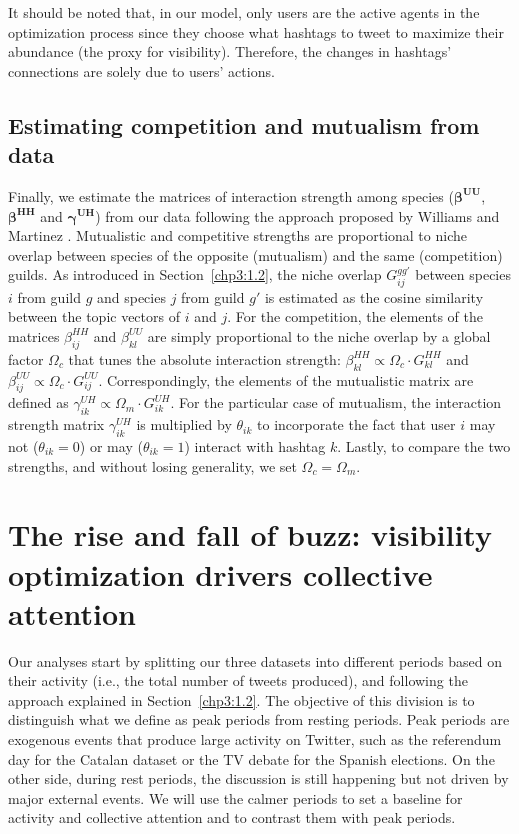 It should be noted that, in our model, only users are the active agents in the optimization process since they choose what hashtags to tweet to maximize their abundance (the proxy for visibility). Therefore, the changes in hashtags' connections are solely due to users' actions.  \\

\subsection{Estimating competition and mutualism from data}
\label{chp3:1.4}
Finally, we estimate the matrices of interaction strength among species ($\boldsymbol{\beta^{UU}}$, $\boldsymbol{\beta^{HH}}$ and $\boldsymbol{\gamma^{UH}}$) from our data following the approach proposed by Williams and Martinez \cite{williams2000niche}. 
Mutualistic and competitive strengths are proportional to niche overlap between species of the opposite (mutualism) and the same (competition) guilds. As introduced in Section~\ref{chp3:1.2}, the niche overlap $G_{ij}^{gg'}$ between species $i$ from guild $g$ and species $j$ from guild $g'$ is estimated as the cosine similarity between the topic vectors of $i$ and $j$. For the competition, the elements of the matrices $\beta_{ij}^{HH}$ and $\beta_{kl}^{UU}$ are simply proportional to the niche overlap by a global factor $\Omega_c$ that tunes the absolute interaction strength: $\beta_{kl}^{HH} \propto \Omega_c \cdot G_{kl}^{HH}$ and $\beta_{ij}^{UU} \propto \Omega_c \cdot G_{ij}^{UU}$. Correspondingly, the elements of the mutualistic matrix are defined as  $\gamma_{ik}^{UH} \propto \Omega_m \cdot G_{ik}^{UH}$. For the particular case of mutualism, the interaction strength matrix $\gamma_{ik}^{UH}$ is multiplied by $\theta_{ik}$ to incorporate the fact that user $i$ may not ($\theta_{ik}=0$) or may ($\theta_{ik}=1$) interact with hashtag $k$. Lastly, to compare the two strengths, and without losing generality, we set $\Omega_c = \Omega_m$. 


\section{The rise and fall of buzz: visibility optimization drivers collective attention}
\label{chp3:2}

Our analyses start by splitting our three datasets into different periods based on their activity (i.e., the total number of tweets produced), and following the approach explained in Section~\ref{chp3:1.2}. The objective of this division is to distinguish what we define as peak periods from resting periods. Peak periods are exogenous events that produce large activity on Twitter, such as the referendum day for the Catalan dataset or the TV debate for the Spanish elections. On the other side, during rest periods, the discussion is still happening but not driven by major external events. We will use the calmer periods to set a baseline for activity and collective attention and to contrast them with peak periods.  \\

